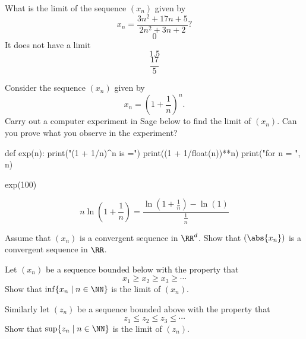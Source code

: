 \documentclass{article}
\begin{document}
\begin{quizexercise}[showhide]
  \begin{quiz}
    \question
    What is the limit of the sequence $(x_n)$ given by
    $$
    x_n = \frac{3 n^2 + 17 n + 5}{2 n^2 + 3 n + 2}?
    $$
    $$0$$
    It does not have a limit
    $$1.5$$
    $$\frac{17}{5}$$
  \end{quiz}
\end{quizexercise}


\beginshex
Consider the sequence $(x_n)$ given by
$$
x_n = \left(1 + \frac{1}{n}\right)^n.
$$
Carry out a computer experiment in Sage below to find the limit
of $(x_n)$. Can you prove what you observe in
the experiment?

\begin{sage}
def exp(n):
  print("(1 + 1/n)^n is =")
  print((1 + 1/float(n))**n)
  print("for n = ", n)

exp(100)  
\end{sage}

\begin{hint}
  $$
  n \ln\left(1 + \frac{1}{n}\right) =
  \frac{\ln\left(1 + \frac{1}{n}\right) - \ln(1)}{\frac{1}{n}}
$$
\end{hint}
\endshex

\beginshex
Assume that $(x_n)$ is a convergent sequence in $\RR^d$. Show that
$(\abs{x_n})$ is a convergent sequence in $\RR$.
\endshex

\beginshex
Let $(x_n)$ be a sequence bounded below with the property that
$$
x_1 \geq x_2 \geq x_3 \geq \cdots
$$
Show that $\inf\{x_n \mid n\in \NN\}$ is the limit of $(x_n)$.

Similarly let $(z_n)$ be a sequence bounded above with the property that
$$
z_1 \leq z_2 \leq z_3 \leq \cdots
$$
Show that $\sup\{z_n \mid n\in \NN\}$ is the limit of $(z_n)$.
\endshex
\end{document}

